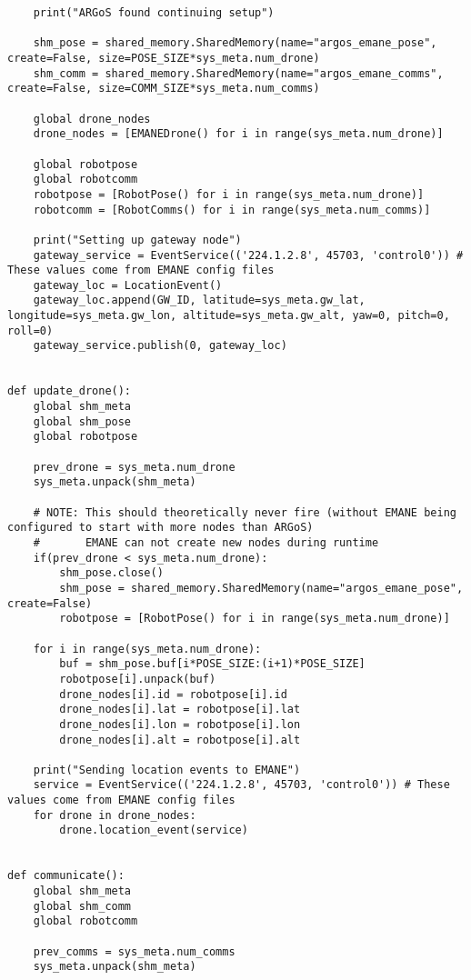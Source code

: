 \begin{verbatim}
    print("ARGoS found continuing setup")

    shm_pose = shared_memory.SharedMemory(name="argos_emane_pose", create=False, size=POSE_SIZE*sys_meta.num_drone)
    shm_comm = shared_memory.SharedMemory(name="argos_emane_comms", create=False, size=COMM_SIZE*sys_meta.num_comms)

    global drone_nodes
    drone_nodes = [EMANEDrone() for i in range(sys_meta.num_drone)]

    global robotpose
    global robotcomm
    robotpose = [RobotPose() for i in range(sys_meta.num_drone)]
    robotcomm = [RobotComms() for i in range(sys_meta.num_comms)]

    print("Setting up gateway node")
    gateway_service = EventService(('224.1.2.8', 45703, 'control0')) # These values come from EMANE config files
    gateway_loc = LocationEvent()
    gateway_loc.append(GW_ID, latitude=sys_meta.gw_lat, longitude=sys_meta.gw_lon, altitude=sys_meta.gw_alt, yaw=0, pitch=0, roll=0)
    gateway_service.publish(0, gateway_loc)


def update_drone():
    global shm_meta
    global shm_pose
    global robotpose

    prev_drone = sys_meta.num_drone
    sys_meta.unpack(shm_meta)

    # NOTE: This should theoretically never fire (without EMANE being configured to start with more nodes than ARGoS)
    #       EMANE can not create new nodes during runtime
    if(prev_drone < sys_meta.num_drone):
        shm_pose.close()
        shm_pose = shared_memory.SharedMemory(name="argos_emane_pose", create=False)
        robotpose = [RobotPose() for i in range(sys_meta.num_drone)]

    for i in range(sys_meta.num_drone):
        buf = shm_pose.buf[i*POSE_SIZE:(i+1)*POSE_SIZE]
        robotpose[i].unpack(buf)
        drone_nodes[i].id = robotpose[i].id
        drone_nodes[i].lat = robotpose[i].lat
        drone_nodes[i].lon = robotpose[i].lon
        drone_nodes[i].alt = robotpose[i].alt

    print("Sending location events to EMANE")
    service = EventService(('224.1.2.8', 45703, 'control0')) # These values come from EMANE config files
    for drone in drone_nodes:
        drone.location_event(service)


def communicate():
    global shm_meta
    global shm_comm
    global robotcomm

    prev_comms = sys_meta.num_comms
    sys_meta.unpack(shm_meta)


\end{verbatim}
